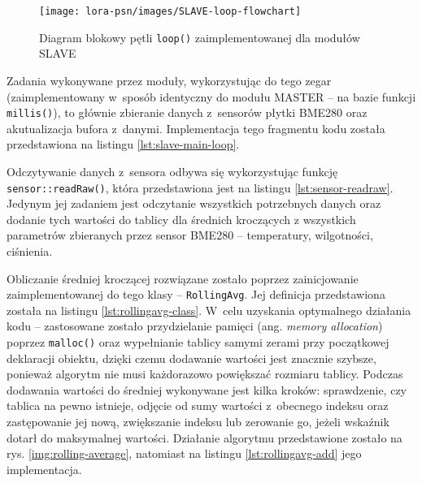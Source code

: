 \begin{figure}[!htbp]
    \centering
    \texttt{[image: lora-psn/images/SLAVE-loop-flowchart]}
    \caption{\label{img:slave-flowchart}Diagram blokowy pętli \texttt{loop()} zaimplementowanej dla modułów SLAVE}
\end{figure}


Zadania wykonywane przez moduły, wykorzystując do tego zegar (zaimplementowany w~sposób identyczny do modułu MASTER --
na bazie funkcji \texttt{millis()}), to głównie zbieranie danych z~sensorów płytki BME280 oraz akutualizacja bufora
z~danymi. Implementacja tego fragmentu kodu została przedstawiona na listingu \ref{lst:slave-main-loop}.



Odczytywanie danych z~sensora odbywa się wykorzystując funkcję \texttt{sensor::readRaw()}, która przedstawiona jest na
listingu \ref{lst:sensor-readraw}. Jedynym jej zadaniem jest odczytanie wszystkich potrzebnych danych oraz dodanie tych
wartości do tablicy dla średnich kroczących z wszystkich parametrów zbieranych przez sensor BME280 -- temperatury,
wilgotności, ciśnienia.



Obliczanie średniej kroczącej rozwiązane zostało poprzez zainicjowanie zaimplementowanej do tego klasy --
\texttt{RollingAvg}. Jej definicja przedstawiona została na listingu \ref{lst:rollingavg-class}. W~celu uzyskania
optymalnego działania kodu -- zastosowane zostało przydzielanie pamięci (ang. \textsl{memory allocation}) poprzez
\texttt{malloc()} oraz wypełnianie tablicy samymi zerami przy początkowej deklaracji obiektu, dzięki czemu dodawanie
wartości jest znacznie szybsze, ponieważ algorytm nie musi każdorazowo powiększać rozmiaru tablicy. Podczas dodawania
wartości do średniej wykonywane jest kilka kroków: sprawdzenie, czy tablica na pewno istnieje, odjęcie od sumy wartości
z~obecnego indeksu oraz zastępowanie jej nową, zwiększanie indeksu lub zerowanie go, jeżeli wskaźnik dotarł do
maksymalnej wartości. Działanie algorytmu przedstawione zostało na rys. \ref{img:rolling-average}, natomiast na listingu
\ref{lst:rollingavg-add} jego implementacja.

